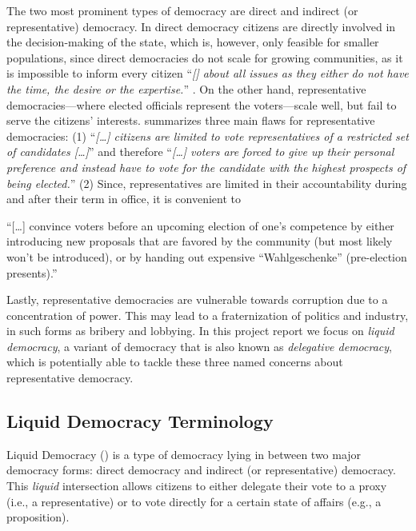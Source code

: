 The two most prominent types of democracy are direct and indirect (or representative) democracy. In direct democracy citizens are directly involved in the decision-making of the state, which is, however, only feasible for smaller populations, since direct democracies do not scale for growing communities, as  it is impossible to inform every citizen “\textit{[\textellipsis{}] about all issues as they either do not have the time, the desire or the expertise.}” \parencite{Schiener2015}. On the other hand, representative democracies---where elected officials represent the voters---scale well, but fail to serve the citizens’ interests. \citeauthor{Schiener2015} summarizes three main flaws for representative democracies: (1) “\textit{[\ldots] citizens are limited to vote representatives of a restricted set of candidates [\ldots]}” and therefore “\textit{[\ldots] voters are forced to give up their personal preference and instead have to vote for the candidate with the highest prospects of being elected.}” (2) Since, representatives are limited in their accountability during and after their term in office, it is convenient to

\begin{displayquote}
“[\ldots] convince voters before an upcoming election of one’s competence by either introducing new proposals that are favored by the community (but most likely won’t be introduced), or by handing out expensive “Wahlgeschenke” (pre-election presents).”\\[1mm]
\hspace*{\fill}\textcite{Schiener2015}
\end{displayquote}

Lastly, representative democracies are vulnerable towards corruption due to a concentration of power. This may lead to a fraternization of politics and industry, in such forms as bribery and lobbying. In this project report we focus on \textit{liquid democracy}, a variant of democracy that is also known as \textit{delegative democracy}, which is potentially able to tackle these three named concerns about representative democracy.


\subsection{Liquid Democracy Terminology}
\label{ssec:Liquid_Democracy}

Liquid Democracy () is a type of democracy lying in between two major democracy forms: direct democracy and indirect (or representative) democracy. This \textit{liquid} intersection allows citizens to either delegate their vote to a proxy (i.e., a representative) or to vote directly for a certain state of affairs (e.g., a proposition).


